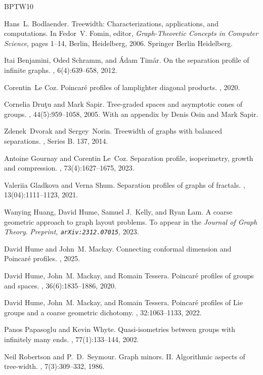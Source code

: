 \documentclass{article}
\numberwithin{equation}{section}
\theoremstyle{definition}
\theoremstyle{citing}
\numberwithin{equation}{section}
\begin{document}
\def\cprime{$'$}
\begin{thebibliography}{BPTW10}

Hans~L. Bodlaender.
\newblock Treewidth: Characterizations, applications, and computations.
\newblock In Fedor~V. Fomin, editor, {\em Graph-Theoretic Concepts in Computer
  Science}, pages 1--14, Berlin, Heidelberg, 2006. Springer Berlin Heidelberg.

Itai Benjamini, Oded Schramm, and {\'A}dam Tim{\'a}r.
\newblock On the separation profile of infinite graphs.
, 6(4):639--658, 2012.

Corentin~Le Coz.
\newblock Poincar\'e profiles of lamplighter diagonal products.
, 2020.

Cornelia Dru{\c{t}}u and Mark Sapir.
\newblock Tree-graded spaces and asymptotic cones of groups.
, 44(5):959--1058, 2005.
\newblock With an appendix by Denis Osin and Mark Sapir.

Zdenek~Dvorak and Sergey~Norin.
\newblock Treewidth of graphs with balanced separations.
, Series B. 137, 2014.

Antoine Gournay and Corentin Le~Coz.
\newblock Separation profile, isoperimetry, growth and compression.
, 73(4):1627--1675, 2023.

Valeriia Gladkova and Verna Shum.
\newblock Separation profiles of graphs of fractals.
, 13(04):1111--1123, 2021.

Wanying Huang, David Hume, Samuel J.~Kelly, and Ryan Lam.
\newblock A coarse geometric approach to graph layout problems.
\newblock To appear in the {\em Journal of Graph Theory}. {\em Preprint, \tt{arXiv:2312.07015}}, 2023.

David Hume and John~M. Mackay.
\newblock Connecting conformal dimension and Poincaré profiles.
, 2025.

David Hume, John~M. Mackay, and Romain Tessera.
\newblock Poincar\'{e} profiles of groups and spaces.
, 36(6):1835--1886, 2020.

David Hume, John~M. Mackay, and Romain Tessera.
\newblock Poincar\'e profiles of {L}ie groups and a coarse geometric dichotomy.
, 32:1063--1133, 2022.

Panos Papasoglu and Kevin Whyte.
\newblock Quasi-isometries between groups with infinitely many ends.
, 77(1):133--144, 2002.

Neil Robertson and P.~D.~Seymour.
\newblock Graph minors. II. Algorithmic aspects of tree-width.
, 7(3):309--332, 1986.

\end{thebibliography}
\end{document}
